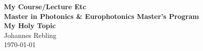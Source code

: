 \documentclass[
a4paper,        			%
DIV=12,
11pt,						%
BCOR=10mm,					%
oneside,					%
headings = normal,			%
listof=totoc,				%
bibliography=totoc,			%
]
{scrartcl}
\begin{document}
\begin{center}
\large
\textbf{My Course/Lecture Etc\\
\vspace{.2em}
Master in Photonics \& Europhotonics Master's Program\\
\vspace{1em}
\Large
My Holy Topic}\\
\vspace{1em}
\large
Johannes Rebling\\
\vspace{.2em}
\today
\end{center}

\pagestyle{empty}

 

\pagestyle{plain}      %
\setcounter{page}{1}



% 


%
\end{document}
